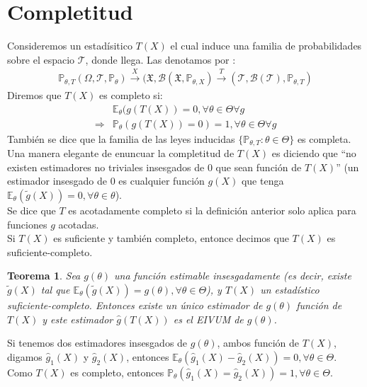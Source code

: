 \documentclass[10pt]{article}
\theoremstyle{plain}
\newtheorem{teo}{Teorema}
\theoremstyle{definition}
\begin{document}
\section{Completitud}
Consideremos un estadísitico $T(X)$ el cual induce una familia de probabilidades sobre el espacio $\mathscr{T}$, donde llega. Las denotamos por :
\begin{align*}
\mathbb{P}_{\theta, T} (\Omega, \mathcal{T}, \mathbb{P}_{\theta}) \xrightarrow{X} (\mathfrak{X}, \mathcal{B}(\mathfrak{X}, \mathbb{P}_{\theta,X}) \xrightarrow{T} (\mathscr{T}, \mathcal{B}(\mathscr{T}), \mathbb{P}_{\theta, T})
\end{align*}
Diremos que $T(X)$ es completo si:
\begin{align*}
&\mathbb{E}_{\theta}(g(T(X)) =0, \forall \theta \in \Theta \forall g\\
\Rightarrow & \mathbb{P}_{\theta}(g(T(X))=0) = 1, \forall \theta \in \Theta \forall g
\end{align*}
También se dice que la familia de las leyes inducidas $\{\mathbb{P}_{\theta,T}\colon \theta \in \Theta\}$ es completa.\\

Una manera elegante de enuncuar la completitud de $T(X)$ es diciendo que ``no existen estimadores no triviales insesgados de 0 que sean función de $T(X)$'' (un estimador insesgado de 0 es cualquier función $g(X)$ que tenga $\mathbb{E}_{\theta}(\tilde{g}(X))=0, \forall \theta \in \theta$).\\

Se dice que $T$ es acotadamente completo si la definición anterior solo aplica para funciones $g$ acotadas.\\
Si $T(X)$ es suficiente y también completo, entonce decimos que $T(X)$ es suficiente-completo.

\begin{teo} Sea $g(\theta)$ una función estimable insesgadamente (es decir, existe $\tilde{g}(X)$ tal que $\mathbb{E}_{\theta}(\tilde{g}(X))=g(\theta), \forall \theta \in \Theta$), y $T(X)$ un estadístico suficiente-completo. Entonces existe un único estimador de $g(\theta)$ función de $T(X)$ y este estimador $\hat{g}(T(X))$ es el EIVUM de $g(\theta)$.\\
\end{teo}
Si tenemos dos estimadores insesgados de $g(\theta)$, ambos función de $T(X)$, digamos $\hat{g}_{1}(X)$ y $\hat{g}_{2}(X)$, entonces $\mathbb{E}_{\theta}(\hat{g}_{1}(X)-\hat{g}_{2}(X)) = 0, \forall \theta \in \Theta$. Como  $T(X)$ es completo, entonces  $\mathbb{P}_{\theta}(\hat{g}_{1}(X) = \hat{g}_{2}(X)) = 1, \forall \theta \in \Theta$.\\
\end{document}
